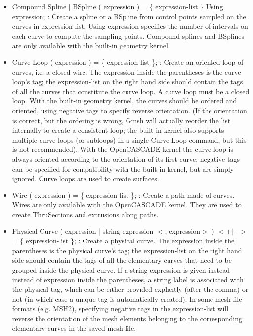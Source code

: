 \documentclass[dvipdfmx, 9pt, a4paper]{article}
\numberwithin{equation}{section}
\begin{document}
\begin{itemize}
\item Compound Spline $|$ BSpline ( expression ) = \{ expression-list \} Using expression; : Create a spline or a BSpline from control points sampled on the curves in expression list. Using expression specifies the number of intervals on each curve to compute the sampling points. Compound splines and BSplines are only available with the built-in geometry kernel.
\item Curve Loop ( expression ) = \{ expression-list \}; : Create an oriented loop of curves, i.e. a closed wire. The expression inside the
parentheses is the curve loop's tag; the expression-list on the right hand side should contain the tags of all the curves that constitute the curve loop. A curve loop must be a closed loop. With the built-in geometry kernel, the curves should be ordered and oriented, using negative tags to specify reverse orientation. (If the orientation is correct, but the ordering is wrong, Gmsh will actually reorder the list internally to create a consistent loop; the built-in kernel also supports multiple curve loops (or subloops) in a single Curve Loop command, but this is not recommended). With the OpenCASCADE kernel the curve loop is always oriented according to the orientation of its first curve; negative tags can be specified for compatibility with the built-in kernel, but are simply ignored. Curve loops are used to create surfaces.
\item Wire ( expression ) = \{ expression-list \}; : Create a path made of curves. Wires are only available with the OpenCASCADE kernel. They are used to create ThruSections and extrusions along paths.
\item Physical Curve ( expression | string-expression $<$, expression$>$ ) $<+|->$= \{ expression-list \}; : Create a physical curve. The expression inside the parentheses is the physical curve's tag; the expression-list on the right hand side should contain the tags of all the elementary curves that need to be grouped inside the physical curve. If a string expression is given instead instead of expression inside the parentheses, a string label is associated with the physical tag, which can be either provided explicitly (after the comma) or not (in which case a unique tag is automatically created). In some mesh file formats (e.g. MSH2), specifying negative tags in the expression-list will reverse the orientation of the mesh elements belonging to the corresponding elementary curves in the saved mesh file.
\end{itemize}
\end{document}
